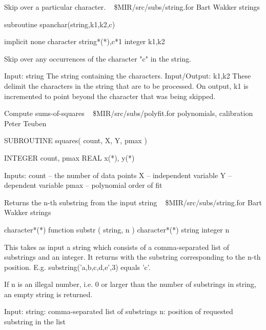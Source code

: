 %
\noindent Skip over a particular character.
\newline \ 
\newline {} \$MIR/src/subs/string.for
\newline {} Bart Wakker
\newline {} strings
\par{\tenpoint
{\eightpoint\begintt
        subroutine spanchar(string,k1,k2,c)

        implicit none
        character string*(*),c*1
        integer k1,k2

  Skip over any occurrences of the character "c" in the string.

  Input:
    string     The string containing the characters.
  Input/Output:
    k1,k2      These delimit the characters in the string that are
               to be processed. On output, k1 is incremented to point
               beyond the character that was being skipped.
\endtt}
\par}
%
\noindent Compute sums-of-squares
\newline \ 
\newline {} \$MIR/src/subs/polyfit.for
\newline {} polynomials, calibration
\newline \abox{Responsible:} Peter Teuben
\par{\tenpoint
{\eightpoint\begintt
        SUBROUTINE squares( count, X, Y, pmax )

        INTEGER count, pmax
        REAL    x(*), y(*)

  Inputs:
       count -- the number of data points
       X     -- independent variable
       Y     -- dependent variable
       pmax  -- polynomial order of fit
\endtt}
\par}
%
\noindent Returns the n-th substring from the input string
\newline \ 
\newline {} \$MIR/src/subs/string.for
\newline \abox{Responsible:} Bart Wakker
\newline {} strings
\par{\tenpoint
{\eightpoint\begintt
      character*(*) function substr ( string, n )
      character*(*) string
      integer       n

 This takes as input a string which consists of a comma-separated list of
 substrings and an integer. It returns with the substring corresponding to
 the n-th position. E.g. substring('a,b,c,d,e',3) equals 'c'.

 If n is an illegal number, i.e. 0 or larger than the number of substrings
 in string, an empty string is returned.

 Input:
   string:     comma-separated list of substrings
   n:          position of requested substring in the list
\endtt}
\par}
